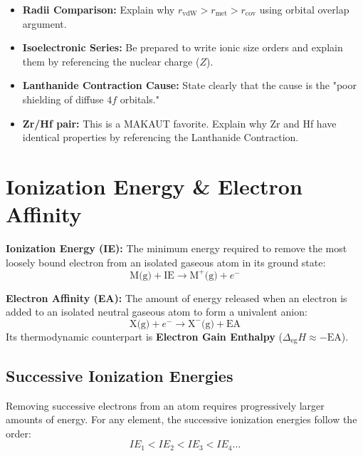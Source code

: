 \documentclass[12pt,a4paper]{article}
\begin{document}
\begin{tcolorbox}[exambox, title={Exam Points: Atomic and Ionic Sizes}]
  \begin{itemize}[leftmargin=*, itemsep=2pt, topsep=2pt]
    \item \textbf{Radii Comparison:} Explain why $r_{\text{vdW}} > r_{\text{met}} > r_{\text{cov}}$ using orbital overlap argument.
    \item \textbf{Isoelectronic Series:} Be prepared to write ionic size orders and explain them by referencing the nuclear charge ($Z$).
    \item \textbf{Lanthanide Contraction Cause:} State clearly that the cause is the "poor shielding of diffuse $4f$ orbitals."
    \item \textbf{Zr/Hf pair:} This is a MAKAUT favorite. Explain why Zr and Hf have identical properties by referencing the Lanthanide Contraction.
  \end{itemize}
\end{tcolorbox}

\section{Ionization Energy \& Electron Affinity}

\begin{tcolorbox}[defbox, title={Definitions: Ionization Energy and Electron Affinity}]
  \textbf{Ionization Energy (IE):} The minimum energy required to remove the most loosely bound electron from an isolated gaseous atom in its ground state:
  \[ \text{M(g)} + \text{IE} \to \text{M}^+\text{(g)} + e^- \]
  \par\vspace{4pt}
  \textbf{Electron Affinity (EA):} The amount of energy released when an electron is added to an isolated neutral gaseous atom to form a univalent anion:
  \[ \text{X(g)} + e^- \to \text{X}^-\text{(g)} + \text{EA} \]
  Its thermodynamic counterpart is \textbf{Electron Gain Enthalpy} ($\Delta_{\text{eg}}H \approx -\text{EA}$).
\end{tcolorbox}

\subsection{Successive Ionization Energies}
Removing successive electrons from an atom requires progressively larger amounts of energy. For any element, the successive ionization energies follow the order:
\[ IE_1 < IE_2 < IE_3 < IE_4 \dots \]
\end{document}
